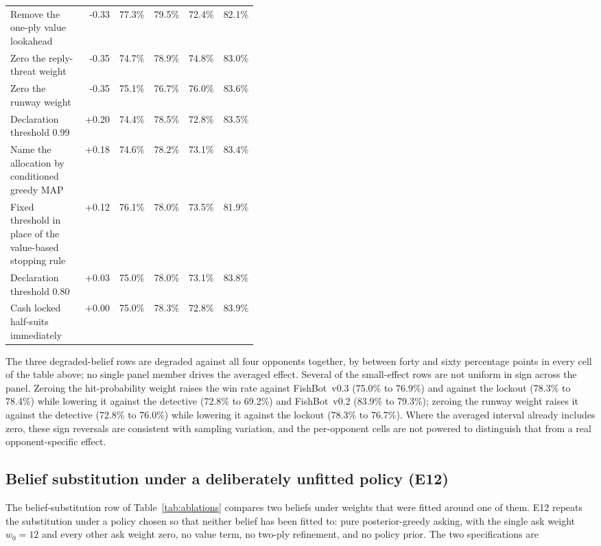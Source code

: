 \documentclass[11pt]{article}
\theoremstyle{definition}
\DeclareRobustCommand{\vthree}{\texorpdfstring{\mbox{FishBot v0.3}}{FishBot v0.3}}
\DeclareRobustCommand{\vtwo}{\texorpdfstring{\mbox{FishBot v0.2}}{FishBot v0.2}}
\newcommand{\numAblStop}{+0.12}
\newcommand{\numAblGmap}{+0.18}
\newcommand{\numAblThreat}{-0.35}
\newcommand{\numAblValue}{-0.33}
\newcommand{\numAblRunway}{-0.35}
\newcommand{\numAblDeclEighty}{+0.03}
\newcommand{\numAblDeclNinetyNine}{+0.20}
\begin{document}
{\begin{longtable}{@{}p{0.42\linewidth}rrrrr@{}}
Remove the one-ply value lookahead & \numAblValue{} & 77.3\% & 79.5\% & 72.4\% & 82.1\% \\
Zero the reply-threat weight & \numAblThreat{} & 74.7\% & 78.9\% & 74.8\% & 83.0\% \\
Zero the runway weight & \numAblRunway{} & 75.1\% & 76.7\% & 76.0\% & 83.6\% \\
\midrule
Declaration threshold 0.99 & \numAblDeclNinetyNine{} & 74.4\% & 78.5\% & 72.8\% & 83.5\% \\
Name the allocation by conditioned greedy MAP & \numAblGmap{} & 74.6\% & 78.2\% & 73.1\% & 83.4\% \\
Fixed threshold in place of the value-based stopping rule & \numAblStop{} & 76.1\% & 78.0\% & 73.5\% & 81.9\% \\
Declaration threshold 0.80 & \numAblDeclEighty{} & 75.0\% & 78.0\% & 73.1\% & 83.8\% \\
Cash locked half-suits immediately & $+0.00$ & 75.0\% & 78.3\% & 72.8\% & 83.9\% \\
\bottomrule
\end{longtable}
}

The three degraded-belief rows are degraded against all four opponents
together, by between forty and sixty percentage points in every cell of the
table above; no single panel member drives the averaged effect. Several of the
small-effect rows are not uniform
in sign across the panel. Zeroing the hit-probability weight raises the win rate
against \vthree{} (75.0\% to 76.9\%) and against the lockout (78.3\% to 78.4\%)
while lowering it against the detective (72.8\% to 69.2\%) and \vtwo{} (83.9\%
to 79.3\%); zeroing the runway weight raises it against the detective (72.8\% to
76.0\%) while lowering it against the lockout (78.3\% to 76.7\%). Where the
averaged interval already includes zero, these sign reversals are consistent
with sampling variation, and the per-opponent cells are not powered to
distinguish that from a real opponent-specific effect.

\subsection{Belief substitution under a deliberately unfitted policy (E12)}
\label{app:abl-e12}

The belief-substitution row of Table~\ref{tab:ablations} compares two beliefs
under weights that were fitted around one of them. E12 repeats the substitution
under a policy chosen so that neither belief has been fitted to: pure
posterior-greedy asking, with the single ask weight $w_0 = 12$ and every other
ask weight zero, no value term, no two-ply refinement, and no policy prior. The
two specifications are
\end{document}
